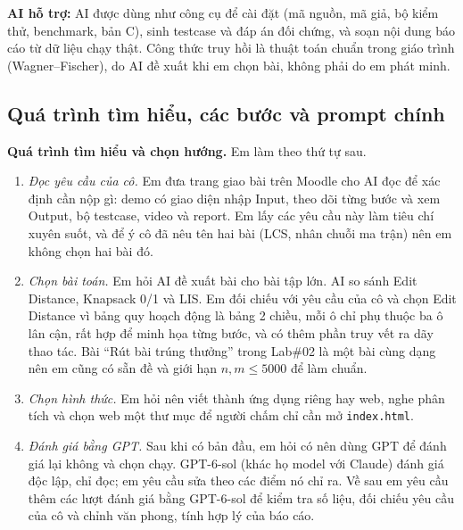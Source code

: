 \documentclass[12pt,a4paper]{article}
\newcommand{\code}[1]{\texttt{#1}}
\begin{document}
\textbf{AI hỗ trợ:} AI được dùng như công cụ để cài đặt (mã nguồn, mã giả, bộ kiểm thử, benchmark, bản C), sinh testcase và đáp án đối chứng, và soạn nội dung báo cáo từ dữ liệu chạy thật. Công thức truy hồi là thuật toán chuẩn trong giáo trình (Wagner--Fischer), do AI đề xuất khi em chọn bài, không phải do em phát minh.

\subsection{Quá trình tìm hiểu, các bước và prompt chính}
\textbf{Quá trình tìm hiểu và chọn hướng.} Em làm theo thứ tự sau.
\begin{enumerate}[nosep]
  \item \emph{Đọc yêu cầu của cô.} Em đưa trang giao bài trên Moodle cho AI đọc để xác định cần nộp gì: demo có giao diện nhập Input, theo dõi từng bước và xem Output, bộ testcase, video và report. Em lấy các yêu cầu này làm tiêu chí xuyên suốt, và để ý cô đã nêu tên hai bài (LCS, nhân chuỗi ma trận) nên em không chọn hai bài đó.
  \item \emph{Chọn bài toán.} Em hỏi AI đề xuất bài cho bài tập lớn. AI so sánh Edit Distance, Knapsack 0/1 và LIS. Em đối chiếu với yêu cầu của cô và chọn Edit Distance vì bảng quy hoạch động là bảng 2 chiều, mỗi ô chỉ phụ thuộc ba ô lân cận, rất hợp để minh họa từng bước, và có thêm phần truy vết ra dãy thao tác. Bài ``Rút bài trúng thưởng'' trong Lab\#02 là một bài cùng dạng nên em cũng có sẵn đề và giới hạn $n,m\le 5000$ để làm chuẩn.
  \item \emph{Chọn hình thức.} Em hỏi nên viết thành ứng dụng riêng hay web, nghe phân tích và chọn web một thư mục để người chấm chỉ cần mở \code{index.html}.
  \item \emph{Đánh giá bằng GPT.} Sau khi có bản đầu, em hỏi có nên dùng GPT để đánh giá lại không và chọn chạy. GPT-6-sol (khác họ model với Claude) đánh giá độc lập, chỉ đọc; em yêu cầu sửa theo các điểm nó chỉ ra. Về sau em yêu cầu thêm các lượt đánh giá bằng GPT-6-sol để kiểm tra số liệu, đối chiếu yêu cầu của cô và chỉnh văn phong, tính hợp lý của báo cáo.
\end{enumerate}
\end{document}
